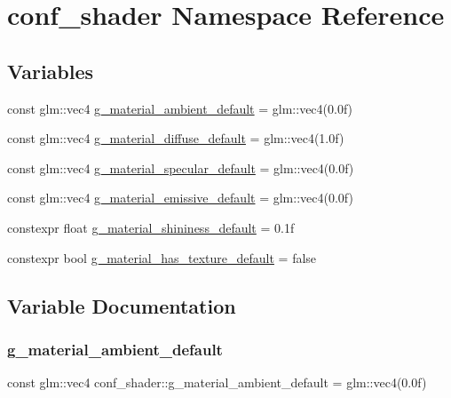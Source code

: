 \hypertarget{namespaceconf__shader}{}\section{conf\+\_\+shader Namespace Reference}
\label{namespaceconf__shader}
\subsection*{Variables}
\begin{DoxyCompactItemize}
\item 
const glm\+::vec4 \mbox{\hyperlink{namespaceconf__shader_a9af9eda085afedfbe5ee6073c059ae51}{g\+\_\+material\+\_\+ambient\+\_\+default}} = glm\+::vec4(0.\+0f)
\item 
const glm\+::vec4 \mbox{\hyperlink{namespaceconf__shader_af0774cb1f8f839b94e2461c2a00e78b4}{g\+\_\+material\+\_\+diffuse\+\_\+default}} = glm\+::vec4(1.\+0f)
\item 
const glm\+::vec4 \mbox{\hyperlink{namespaceconf__shader_ab528ab684d029b03b166b3e3adce40c3}{g\+\_\+material\+\_\+specular\+\_\+default}} = glm\+::vec4(0.\+0f)
\item 
const glm\+::vec4 \mbox{\hyperlink{namespaceconf__shader_a972160bbae99d646803a935fc43e0eae}{g\+\_\+material\+\_\+emissive\+\_\+default}} = glm\+::vec4(0.\+0f)
\item 
constexpr float \mbox{\hyperlink{namespaceconf__shader_a5d0eae157a39c6c34485f122a0e7ccd0}{g\+\_\+material\+\_\+shininess\+\_\+default}} = 0.\+1f
\item 
constexpr bool \mbox{\hyperlink{namespaceconf__shader_aca804b51be156e9350148e18765add87}{g\+\_\+material\+\_\+has\+\_\+texture\+\_\+default}} = false
\end{DoxyCompactItemize}


\subsection{Variable Documentation}
\mbox{\label{namespaceconf__shader_a9af9eda085afedfbe5ee6073c059ae51}} 
\subsubsection{\texorpdfstring{g\+\_\+material\+\_\+ambient\+\_\+default}{g\_material\_ambient\_default}}
{\footnotesize\ttfamily const glm\+::vec4 conf\+\_\+shader\+::g\+\_\+material\+\_\+ambient\+\_\+default = glm\+::vec4(0.\+0f)}

